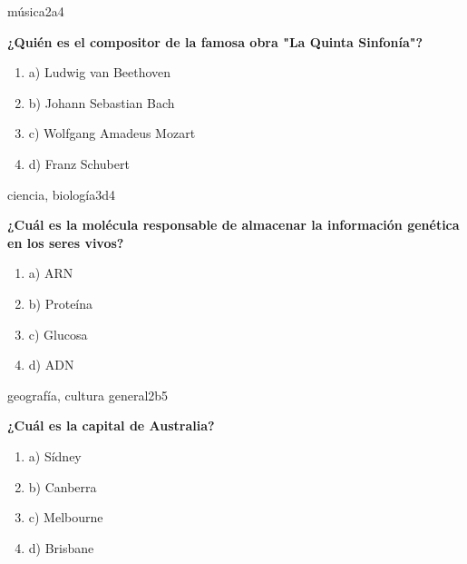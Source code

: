 \documentclass{article}
\begin{document}
\begin{question}{7}{música}{2}{a}{4}{
\textbf{¿Quién es el compositor de la famosa obra "La Quinta Sinfonía"?}\\

\begin{enumerate}
    \item a) Ludwig van Beethoven
    \item b) Johann Sebastian Bach
    \item c) Wolfgang Amadeus Mozart
    \item d) Franz Schubert
\end{enumerate}
}
\end{question}

\begin{question}{8}{ciencia, biología}{3}{d}{4}{
\textbf{¿Cuál es la molécula responsable de almacenar la información genética en los seres vivos?}\\

\begin{enumerate}
    \item a) ARN
    \item b) Proteína
    \item c) Glucosa
    \item d) ADN
\end{enumerate}
}
\end{question}

\begin{question}{9}{geografía, cultura general}{2}{b}{5}{
\textbf{¿Cuál es la capital de Australia?}\\

\begin{enumerate}
    \item a) Sídney
    \item b) Canberra
    \item c) Melbourne
    \item d) Brisbane
\end{enumerate}
}
\end{question}
\end{document}
